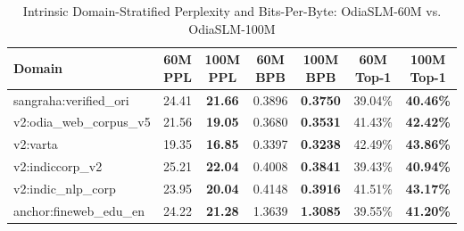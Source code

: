 \begin{table}[ht]
\centering
\caption{Intrinsic Domain-Stratified Perplexity and Bits-Per-Byte: OdiaSLM-60M vs. OdiaSLM-100M}
\begin{tabular}{lcccccc}
\hline
\textbf{Domain} & \textbf{60M PPL} & \textbf{100M PPL} & \textbf{60M BPB} & \textbf{100M BPB} & \textbf{60M Top-1} & \textbf{100M Top-1} \\
\hline
sangraha:verified\_ori & 24.41 & \textbf{21.66} & 0.3896 & \textbf{0.3750} & 39.04\% & \textbf{40.46\%} \\
v2:odia\_web\_corpus\_v5 & 21.56 & \textbf{19.05} & 0.3680 & \textbf{0.3531} & 41.43\% & \textbf{42.42\%} \\
v2:varta & 19.35 & \textbf{16.85} & 0.3397 & \textbf{0.3238} & 42.49\% & \textbf{43.86\%} \\
v2:indiccorp\_v2 & 25.21 & \textbf{22.04} & 0.4008 & \textbf{0.3841} & 39.43\% & \textbf{40.94\%} \\
v2:indic\_nlp\_corp & 23.95 & \textbf{20.04} & 0.4148 & \textbf{0.3916} & 41.51\% & \textbf{43.17\%} \\
anchor:fineweb\_edu\_en & 24.22 & \textbf{21.28} & 1.3639 & \textbf{1.3085} & 39.55\% & \textbf{41.20\%} \\
\hline
\end{tabular}
\end{table}